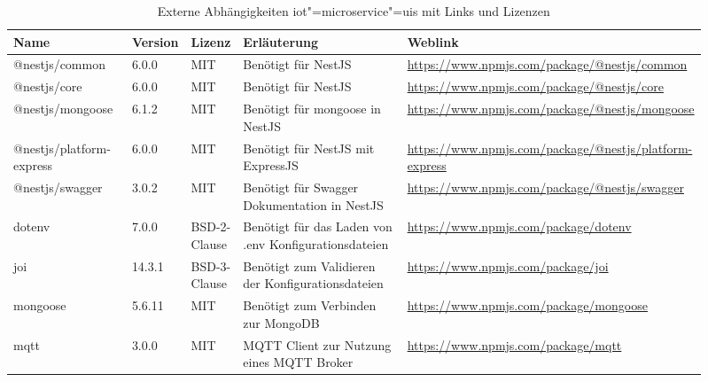 \begin{landscape}
\begin{table}[htb]
	\caption{Externe Abhängigkeiten iot"=microservice"=uis mit Links und Lizenzen}
	\begin{tabular}{|p{0.18\linewidth}|p{0.06\linewidth}|p{0.06\linewidth}|p{0.28\linewidth}|p{0.33\linewidth}|}
		\hline
		Name & Version & Lizenz & Erläuterung & Weblink \\ \hline
		@nestjs/common & 6.0.0 & MIT & Benötigt für NestJS & \small\url{https://www.npmjs.com/package/@nestjs/common} \\ \hline
		@nestjs/core & 6.0.0 & MIT & Benötigt für NestJS & \small\url{https://www.npmjs.com/package/@nestjs/core} \\ \hline
		@nestjs/mongoose & 6.1.2 & MIT & Benötigt für mongoose in NestJS & \small\url{https://www.npmjs.com/package/@nestjs/mongoose} \\ \hline
		@nestjs/platform-express & 6.0.0 & MIT & Benötigt für NestJS mit ExpressJS & \small\url{https://www.npmjs.com/package/@nestjs/platform-express} \\ \hline
		@nestjs/swagger & 3.0.2 & MIT & Benötigt für Swagger Dokumentation in NestJS & \small\url{https://www.npmjs.com/package/@nestjs/swagger} \\ \hline
		dotenv & 7.0.0 & BSD-2-Clause & Benötigt für das Laden von .env Konfigurationsdateien & \small\url{https://www.npmjs.com/package/dotenv} \\ \hline
		joi & 14.3.1 & BSD-3-Clause & Benötigt zum Validieren der Konfigurationsdateien & \small\url{https://www.npmjs.com/package/joi} \\ \hline
		mongoose & 5.6.11 & MIT & Benötigt zum Verbinden zur MongoDB & \small\url{https://www.npmjs.com/package/mongoose} \\ \hline
		mqtt & 3.0.0 & MIT & MQTT Client zur Nutzung eines MQTT Broker & \small\url{https://www.npmjs.com/package/mqtt} \\ \hline
	\end{tabular}
	\label{tbl:dependenciesMicroUIS}
\end{table}

\end{landscape}
